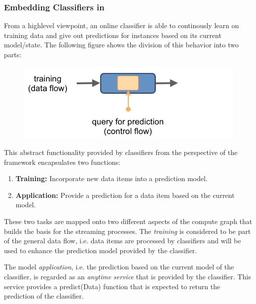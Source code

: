 \subsubsection{\label{sec:streamsClassifiers}Embedding Classifiers in \streams}
From a highlevel viewpoint, an online classifier is able to
continously learn on training data and give out predictions for
instances based on its current model/state. The following figure%
shows the division of this behavior into two parts:
\begin{figure}[h!]
  \centering
  \includegraphics[scale=0.35]{graphics/online-learning.png}
\end{figure}

\vspace{-2ex}
This abstract functionality provided by classifiers from the
perspective of the \streams framework encapsulates two functions:
\begin{enumerate}
\item {\bf Training:} Incorporate new data items into a prediction
  model.
\item {\bf Application:} Provide a prediction for a data item based on
  the current model.
\end{enumerate}
These two tasks are mapped onto two different aspects of the compute
graph that builds the basis for the streaming processes. The {\em
  training} is considered to be part of the general data flow,
i.e. data items are processed by classifiers and will be used to
enhance the prediction model provided by the classifier.

The model {\em application}, i.e. the prediction based on the current
model of the classifier, is regarded as an {\em anytime service} that
is provided by the classifier. This service provides a {\ttfamily
  predict(Data)} function that is expected to return the prediction of
the classifier.


